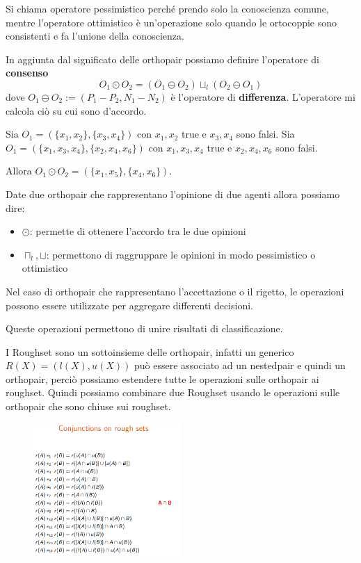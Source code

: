 Si chiama operatore pessimistico perché prendo solo la conoscienza comune, mentre 
l'operatore ottimistico è un'operazione solo quando le ortocoppie sono consistenti e 
fa l'unione della conoscienza.

In aggiunta dal significato delle orthopair possiamo definire l'operatore di \textbf{consenso}
$$O_1 \odot O _2 = (O_1 \ominus O _2) \sqcup_l (O_2 \ominus O_1)$$
dove $O_1 \ominus O _2 :=  (P_1-P_2,N_1-N_2)$ è l'operatore di \textbf{differenza}.
L'operatore mi calcola ciò su cui sono d'accordo.
\begin{esempio}
    Sia $O_1=(\{x_1,x_2\},\{x_3,x_4\})$ con $x_1,x_2$ true e $x_3,x_4$ sono falsi.
    Sia $O_1=(\{x_1,x_3,x_4\},\{x_2,x_4,x_6\})$ con $x_1,x_3,x_4$ true e $x_2,x_4,x_6$ sono falsi.

    Allora $O_1 \odot O _2 = (\{x_1,x_5\},\{x_4,x_6\})$. 
\end{esempio}

Date due orthopair che rappresentano l'opinione di due agenti allora possiamo dire:
\begin{itemize}
    \item $\odot$: permette di ottenere l'accordo tra le due opinioni
    \item $\sqcap_l, \sqcup$: permettono di raggruppare le opinioni in modo pessimistico 
    o ottimistico
\end{itemize}

Nel caso di orthopair che rappresentano l'accettazione o il rigetto, le operazioni 
possono essere utilizzate per aggregare differenti decisioni. 

\begin{esempio}
    Queste operazioni permettono di unire risultati di classificazione.
    
\end{esempio}

I Roughset sono un sottoinsieme delle orthopair, infatti un generico $R(X)= (l(X), u(X))$ 
può essere associato ad un nestedpair e quindi un orthopair, perciò possiamo estendere 
tutte le operazioni sulle orthopair ai roughset.
Quindi possiamo combinare due Roughset usando le operazioni sulle orthopair che sono 
chiuse sui roughset. 

\begin{figure}[!h]
    \centering
    \includegraphics[width=0.5\textwidth]{img/sistemi_incerti/conj_RS.png}
\end{figure}

